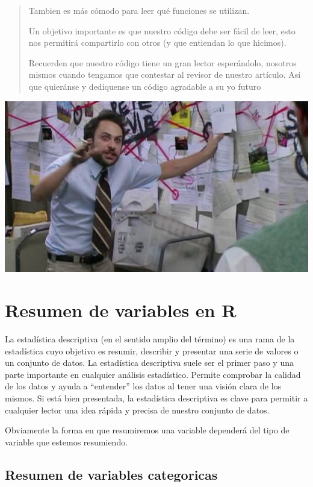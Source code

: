 \documentclass[
]{book}
\begin{document}
\begin{quote}
Tambien es más cómodo para leer qué funciones se utilizan.

Un objetivo importante es que nuestro código debe ser fácil de leer, esto nos permitirá compartirlo con otros (y que entiendan lo que hicimos).

Recuerden que nuestro código tiene un gran lector esperándolo, nosotros mismos cuando tengamos que contestar al revisor de nuestro artículo. Así que quieránse y dediquense un código agradable a su yo futuro
\end{quote}

\includegraphics[width=9.72in]{img/conspiranoico}

\hypertarget{resumen-de-variables-en-r}{%
\chapter{Resumen de variables en R}\label{resumen-de-variables-en-r}}

La estadística descriptiva (en el sentido amplio del término) es una rama de la estadística cuyo objetivo es resumir, describir y presentar una serie de valores o un conjunto de datos. La estadística descriptiva suele ser el primer paso y una parte importante en cualquier análisis estadístico. Permite comprobar la calidad de los datos y ayuda a ``entender'' los datos al tener una visión clara de los mismos. Si está bien presentada, la estadística descriptiva es clave para permitir a cualquier lector una idea rápida y precisa de nuestro conjunto de datos.

Obviamente la forma en que resumiremos una variable dependerá del tipo de variable que estemos resumiendo.

\hypertarget{resumen-de-variables-categoricas}{%
\section{Resumen de variables categoricas}\label{resumen-de-variables-categoricas}}
\end{document}
